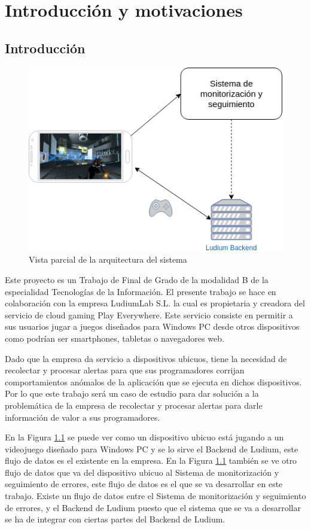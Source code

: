 \chapter{Introducción y motivaciones}

\section{Introducción}

\begin{figure}[!htb]
	\includegraphics[width=\linewidth] {Moduloss-Intro.png}
	\caption{Vista parcial de la arquitectura del sistema}
	\label{fig:intro}
\end{figure}

Este proyecto es un Trabajo de Final de Grado de la modalidad B de la especialidad Tecnologías de la Información. El presente trabajo se hace en colaboración con la empresa LudiumLab S.L. la cual es propietaria y creadora del servicio de cloud gaming Play Everywhere. Este servicio consiste en permitir a sus usuarios jugar a juegos diseñados para Windows PC desde otros dispositivos como podrían ser smartphones, tabletas o navegadores web. 

Dado que la empresa da servicio a dispositivos ubicuos, tiene la necesidad de recolectar y procesar alertas para que sus programadores corrijan comportamientos anómalos de la aplicación que se ejecuta en dichos dispositivos. Por lo que este trabajo será un caso de estudio para dar solución a la problemática de la empresa de recolectar y procesar alertas para darle información de valor a sus programadores.

En la Figura \ref{fig:intro} se puede ver como un dispositivo ubicuo está jugando a un videojuego diseñado para Windows PC y se lo sirve el Backend de Ludium, este flujo de datos es el existente en la empresa. En la Figura \ref{fig:intro} también se ve otro flujo de datos que va del dispositivo ubicuo al Sistema de monitorización y seguimiento de errores, este flujo de datos es el que se va desarrollar en este trabajo. Existe un flujo de datos entre el Sistema de monitorización y seguimiento de errores, y el Backend de Ludium puesto que el sistema que se va a desarrollar se ha de integrar con ciertas partes del Backend de Ludium.


